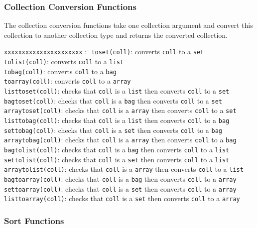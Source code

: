 \subsubsection{Collection Conversion Functions}

The collection conversion functions take one collection argument and
convert this collection to another collection type and returns
the converted collection.

\newcommand{\checkcoll}[1]{checks that \texttt{coll} is a \texttt{#1} then }
\newcommand{\convcoll}[1]{converts \texttt{coll} to a \texttt{#1}}

\begin{tabbing}
\texttt{xxxxxxxxxxxxxxxxxxxxxx} \= : \=\kill
\texttt{toset(coll)}\>: \convcoll{set}\\
\texttt{tolist(coll)}\>: \convcoll{list}\\
\texttt{tobag(coll)}\>: \convcoll{bag}\\
\texttt{toarray(coll)}\>: \convcoll{array}\\
\texttt{listtoset(coll)}\>: \checkcoll{list} \convcoll{set}\\
\texttt{bagtoset(coll)}\>: \checkcoll{bag} \convcoll{set}\\
\texttt{arraytoset(coll)}\>: \checkcoll{array} \convcoll{set}\\
\texttt{listtobag(coll)}\>: \checkcoll{list} \convcoll{bag}\\
\texttt{settobag(coll)}\>: \checkcoll{set} \convcoll{bag}\\
\texttt{arraytobag(coll)}\>: \checkcoll{array} \convcoll{bag}\\
\texttt{bagtolist(coll)}\>: \checkcoll{bag} \convcoll{list}\\
\texttt{settolist(coll)}\>: \checkcoll{set} \convcoll{list}\\
\texttt{arraytolist(coll)}\>: \checkcoll{array} \convcoll{list}\\
\texttt{bagtoarray(coll)}\>: \checkcoll{bag} \convcoll{array}\\
\texttt{settoarray(coll)}\>: \checkcoll{set} \convcoll{array}\\
\texttt{listtoarray(coll)}\>: \checkcoll{set} \convcoll{array}\\
\end{tabbing}

\subsubsection{Sort Functions}

